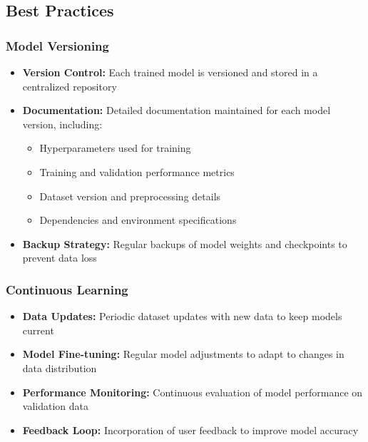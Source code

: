 \subsection{Best Practices}
\label{subsection:best-practices}

\subsubsection{Model Versioning}
\label{subsubsection:model-versioning}

\begin{itemize}
    \item \textbf{Version Control:} Each trained model is versioned and stored in a centralized repository
    \item \textbf{Documentation:} Detailed documentation maintained for each model version, including:
    \begin{itemize}
        \item Hyperparameters used for training
        \item Training and validation performance metrics
        \item Dataset version and preprocessing details
        \item Dependencies and environment specifications
    \end{itemize}
    \item \textbf{Backup Strategy:} Regular backups of model weights and checkpoints to prevent data loss
\end{itemize}

\subsubsection{Continuous Learning}
\label{subsubsection:continuous-learning}

\begin{itemize}
    \item \textbf{Data Updates:} Periodic dataset updates with new data to keep models current
    \item \textbf{Model Fine-tuning:} Regular model adjustments to adapt to changes in data distribution
    \item \textbf{Performance Monitoring:} Continuous evaluation of model performance on validation data
    \item \textbf{Feedback Loop:} Incorporation of user feedback to improve model accuracy
\end{itemize}

